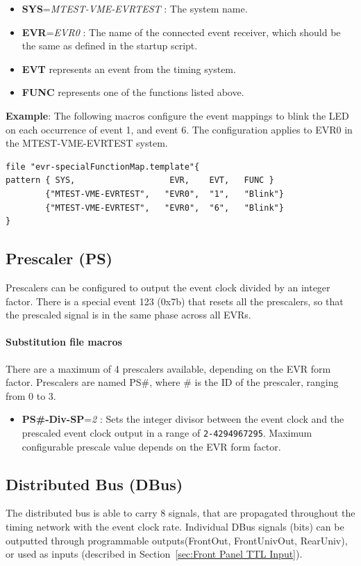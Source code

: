 \documentclass[12pt,a4paper]{article}
\begin{document}
\begin{itemize}
\item
	\textbf{SYS}=\emph{MTEST-VME-EVRTEST} : The system name. 
\item
	\textbf{EVR}=\emph{EVR0} : The name of the connected event receiver, which should be the same as defined in the startup script. 
\item
  \textbf{EVT} represents an event from the timing system.
\item
  \textbf{FUNC} represents one of the functions listed above.
\end{itemize}

\textbf{Example}: The following macros configure the event mappings to blink the LED on each occurrence of event 1, and event 6. The configuration applies to EVR0 in the MTEST-VME-EVRTEST system.

\begin{verbatim}
file "evr-specialFunctionMap.template"{
pattern { SYS,                   EVR,    EVT,   FUNC }
        {"MTEST-VME-EVRTEST",   "EVR0",  "1",   "Blink"}
        {"MTEST-VME-EVRTEST",   "EVR0",  "6",   "Blink"}
}
\end{verbatim}


\subsection{Prescaler (PS)}\label{sec:Prescaler}
Prescalers can be configured to output the event clock divided by an integer factor. There is a special event 123 (0x7b) that resets all the prescalers, so that the prescaled signal is in the same phase across all EVRs.

\paragraph{Substitution file macros}
There are a maximum of 4 prescalers available, depending on the EVR form factor. Prescalers are named PS\#, where \# is the ID of the prescaler, ranging from 0 to 3.
\begin{itemize}
  \item
    \textbf{PS\#-Div-SP}=\emph{2} : Sets the integer divisor between the event clock and the prescaled event clock output in a range of \texttt{2-4294967295}. Maximum configurable prescale value depends on the EVR form factor.
  \end{itemize}


\subsection{Distributed Bus (DBus)}\label{sec:DBus}
The distributed bus is able to carry 8 signals, that are propagated throughout the timing network with the event clock rate. Individual DBus signals (bits) can be outputted through programmable outputs(FrontOut, FrontUnivOut, RearUniv), or used as inputs (described in Section~\ref{sec:Front Panel TTL Input}).
\end{document}
